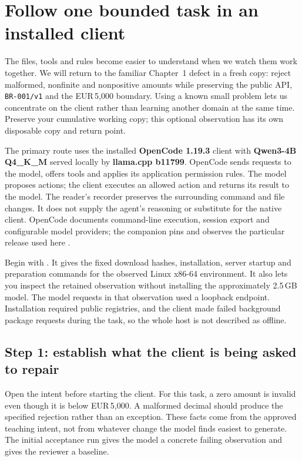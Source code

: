 \section{Follow one bounded task in an installed client}\label{sec:ch2-native-observation}

The files, tools and rules become easier to understand when we watch them work together. We will return to the familiar Chapter~1 defect in a fresh copy: reject malformed, nonfinite and nonpositive amounts while preserving the public API, \texttt{BR-001/v1} and the EUR\,5,000 boundary. Using a known small problem lets us concentrate on the client rather than learning another domain at the same time. Preserve your cumulative working copy; this optional observation has its own disposable copy and return point.

The primary route uses the installed \textbf{OpenCode 1.19.3} client with \textbf{Qwen3-4B Q4\_K\_M} served locally by \textbf{llama.cpp b11799}. OpenCode sends requests to the model, offers tools and applies its application permission rules. The model proposes actions; the client executes an allowed action and returns its result to the model. The reader's recorder preserves the surrounding command and file changes. It does not supply the agent's reasoning or substitute for the native client. OpenCode documents command-line execution, session export and configurable model providers; the companion pins and observes the particular release used here \parencite{opencodeCliD6_2026,opencodeProvidersD6_2026}.

Begin with . It gives the fixed download hashes, installation, server startup and preparation commands for the observed Linux x86-64 environment. It also lets you inspect the retained observation without installing the approximately 2.5\,GB model. The model requests in that observation used a loopback endpoint. Installation required public registries, and the client made failed background package requests during the task, so the whole host is not described as offline.

\subsection*{Step 1: establish what the client is being asked to repair}

Open the intent before starting the client. For this task, a zero amount is invalid even though it is below EUR\,5,000. A malformed decimal should produce the specified rejection rather than an exception. These facts come from the approved teaching intent, not from whatever change the model finds easiest to generate. The initial acceptance run gives the model a concrete failing observation and gives the reviewer a baseline.

